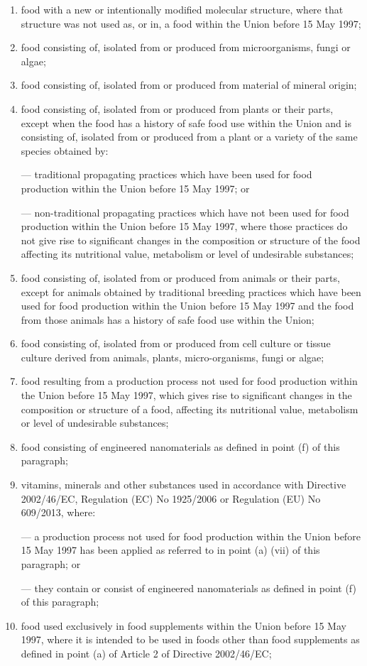 \documentclass[12pt]{article}
\begin{document}
\begin{enumerate}[label=(\roman*)]
    \item food with a new or intentionally modified molecular structure, where that structure was not used as, or in, a food within the Union before 15 May 1997;
    \item food consisting of, isolated from or produced from microorganisms, fungi or algae;
    \item food consisting of, isolated from or produced from material of mineral origin;
    \item food consisting of, isolated from or produced from plants or their parts, except when the food has a history of safe food use within the Union and is consisting of, isolated from or produced from a plant or a variety of the same species obtained by:
    
    — traditional propagating practices which have been used for food production within the Union before
    15 May 1997; or

    — non-traditional propagating practices which have not been used for food production within the Union
    before 15 May 1997, where those practices do not give rise to significant changes in the composition or
    structure of the food affecting its nutritional value, metabolism or level of undesirable substances;
    \item food consisting of, isolated from or produced from animals or their parts, except for animals obtained by
    traditional breeding practices which have been used for food production within the Union before 15 May 1997
    and the food from those animals has a history of safe food use within the Union;
    \item food consisting of, isolated from or produced from cell culture or tissue culture derived from animals, plants,
    micro-organisms, fungi or algae;
    \item food resulting from a production process not used for food production within the Union before 15 May 1997,
    which gives rise to significant changes in the composition or structure of a food, affecting its nutritional value,
    metabolism or level of undesirable substances;
    \item  food consisting of engineered nanomaterials as defined in point (f) of this paragraph;
    \item  vitamins, minerals and other substances used in accordance with Directive 2002/46/EC, Regulation (EC)
    No 1925/2006 or Regulation (EU) No 609/2013, where:
    
    — a production process not used for food production within the Union before 15 May 1997 has been applied
    as referred to in point (a) (vii) of this paragraph; or
    
    — they contain or consist of engineered nanomaterials as defined in point (f) of this paragraph;
    \item food used exclusively in food supplements within the Union before 15 May 1997, where it is intended to be
    used in foods other than food supplements as defined in point (a) of Article 2 of Directive 2002/46/EC;
\end{enumerate}
\end{document}
